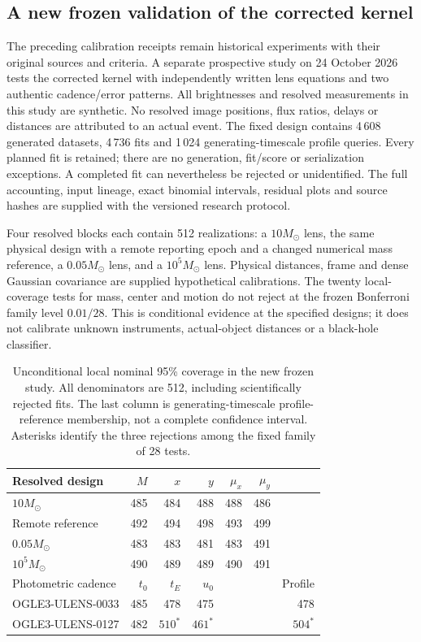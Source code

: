 \subsection{A new frozen validation of the corrected kernel}
\label{sec:current-kernel-calibration}
The preceding calibration receipts remain historical experiments with their
original sources and criteria. A separate prospective study on 24 October
2026 tests the corrected kernel with independently written lens equations
and two authentic cadence/error patterns. All brightnesses and resolved
measurements in this study are synthetic. No resolved image positions,
flux ratios, delays or distances are attributed to an actual event.
The fixed design contains 4\,608 generated datasets, 4\,736 fits and
1\,024 generating-timescale profile queries. Every planned fit is retained;
there are no generation, fit/score or serialization exceptions. A completed
fit can nevertheless be rejected or unidentified. The full accounting,
input lineage, exact binomial intervals, residual plots and source hashes
are supplied with the versioned research protocol.

Four resolved blocks each contain 512 realizations: a $10M_\odot$ lens,
the same physical design with a remote reporting epoch and a changed
numerical mass reference, a $0.05M_\odot$ lens, and a $10^5M_\odot$ lens.
Physical distances, frame and dense Gaussian covariance are supplied
hypothetical calibrations. The twenty local-coverage tests for mass,
center and motion do not reject at the frozen Bonferroni family level
$0.01/28$. This is conditional evidence at the specified designs; it
does not calibrate unknown instruments, actual-object distances or a
black-hole classifier.

\begin{table}[tbp]
\centering\small
\caption{Unconditional local nominal 95\% coverage in the new frozen
study. All denominators are 512, including scientifically rejected fits.
The last column is generating-timescale profile-reference membership,
not a complete confidence interval. Asterisks identify the three
rejections among the fixed family of 28 tests.}
\label{tab:current-kernel-coverage}
\begin{tabular}{@{}lrrrrrr@{}}
\toprule
Resolved design & $M$ & $x$ & $y$ & $\mu_x$ & $\mu_y$ & \\
\midrule
$10M_\odot$ & 485 & 484 & 488 & 488 & 486 & \\
Remote reference & 492 & 494 & 498 & 493 & 499 & \\
$0.05M_\odot$ & 483 & 483 & 481 & 483 & 491 & \\
$10^5M_\odot$ & 490 & 489 & 489 & 490 & 491 & \\
\midrule
Photometric cadence & $t_0$ & $t_E$ & $u_0$ & & & Profile \\
\midrule
OGLE3-ULENS-0033 & 485 & 478 & 475 & & & 478 \\
OGLE3-ULENS-0127 & 482 & $510^{*}$ & $461^{*}$ & & & $504^{*}$ \\
\bottomrule
\end{tabular}
\end{table}

